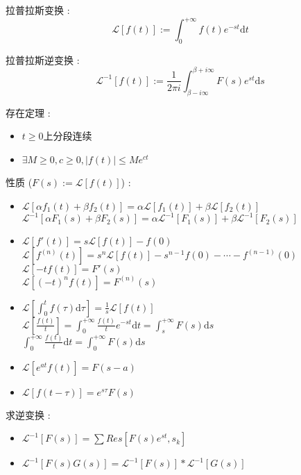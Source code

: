 \documentclass[UTF8, 12pt]{ctexart}
\begin{document}
	
	拉普拉斯变换 : \[ \mathscr{L}[f(t)] := \int_{0}^{+\infty}f(t)e^{-st}\mathrm{d}t \]	

	拉普拉斯逆变换 : \[ \mathscr{L}^{-1}[f(t)] := \frac{1}{2\pi i}\int_{\beta-i\infty}^{\beta+i\infty}F(s)e^{st}\mathrm{d}s \]

	存在定理 : 
	\begin{itemize}[leftmargin = 4em]
		\item $ t \geq 0 $上分段连续
		\item $ \exists M \geq 0, c \geq 0, |f(t)| \leq Me^{ct} $
	\end{itemize}

	性质 ($ F(s) := \mathscr{L}[f(t)] $) : 
	\begin{itemize}[leftmargin = 4em]
		\item $ \mathscr{L}[\alpha f_1(t) + \beta f_2(t)] = \alpha\mathscr{L}[f_1(t)] + \beta\mathscr{L}[f_2(t)] $ \\
				$ \mathscr{L}^{-1}[\alpha F_1(s) + \beta F_2(s)] = \alpha\mathscr{L}^{-1}[F_1(s)] + \beta\mathscr{L}^{-1}[F_2(s)] $
		\item $ \mathscr{L}[f'(t)] = s\mathscr{L}[f(t)] - f(0) $ \\
				$ \mathscr{L}[f^{(n)}(t)] = s^{n}\mathscr{L}[f(t)] - s^{n-1}f(0) - \cdots - f^{(n-1)}(0) $ \\
				$ \mathscr{L}[-tf(t)] = F'(s) $ \\
				$ \mathscr{L}[(-t)^{n}f(t)] = F^{(n)}(s) $
		\item $ \mathscr{L}[\int_{0}^{t}f(\tau)\mathrm{d}\tau] = \frac{1}{s}\mathscr{L}[f(t)] $ \\
				$ \mathscr{L}[\frac{f(t)}{t}] = \int_0^{+\infty}\frac{f(t)}{t}e^{-st}\mathrm{d}t = \int_{s}^{+\infty}F(s)\mathrm{d}s $ \\
				$ \int_{0}^{+\infty}\frac{f(t)}{t}\mathrm{d}t = \int_{0}^{+\infty}F(s)\mathrm{d}s $
		\item $ \mathscr{L}[e^{at}f(t)] = F(s-a) $
		\item $ \mathscr{L}[f(t-\tau)] = e^{s\tau}F(s) $ 
	\end{itemize}

	求逆变换 :
	\begin{itemize}[leftmargin = 4em]
		\item $ \mathscr{L}^{-1}[F(s)] = \sum Res[F(s)e^{st}, s_k] $
		\item $ \mathscr{L}^{-1}[F(s)G(s)] = \mathscr{L}^{-1}[F(s)] * \mathscr{L}^{-1}[G(s)] $
	\end{itemize}
\end{document}
